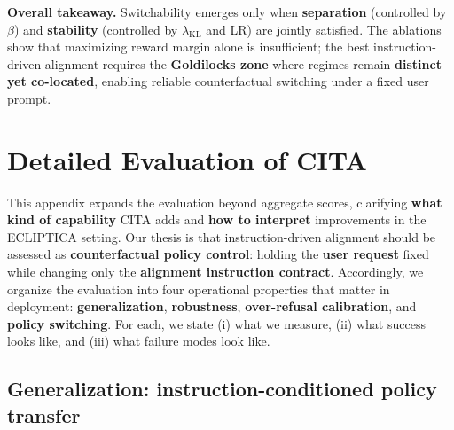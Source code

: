 \vspace{-0.25em}
\noindent
\textbf{Overall takeaway.}
Switchability emerges only when \textbf{separation} (controlled by $\beta$) and \textbf{stability} (controlled by $\lambda_{\text{KL}}$ and LR) are jointly satisfied.
The ablations show that maximizing reward margin alone is insufficient; the best instruction-driven alignment requires the \textbf{Goldilocks zone} where regimes remain \textbf{distinct yet co-located}, enabling reliable counterfactual switching under a fixed user prompt.






\section{Detailed Evaluation of \textsc{CITA}}
\label{sec:appendix_benefits}

\vspace{-0.25em}
\noindent
This appendix expands the evaluation beyond aggregate scores, clarifying \textbf{what kind of capability} \textsc{CITA} adds and \textbf{how to interpret} improvements in the ECLIPTICA setting.
Our thesis is that instruction-driven alignment should be assessed as \textbf{counterfactual policy control}:
holding the \textbf{user request} fixed while changing only the \textbf{alignment instruction contract}.
Accordingly, we organize the evaluation into four operational properties that matter in deployment:
\textbf{generalization}, \textbf{robustness}, \textbf{over-refusal calibration}, and \textbf{policy switching}.
For each, we state (i) what we measure, (ii) what success looks like, and (iii) what failure modes look like.

\vspace{-0.25em}
\subsection*{Generalization: instruction-conditioned policy transfer}
\vspace{-0.15em}

